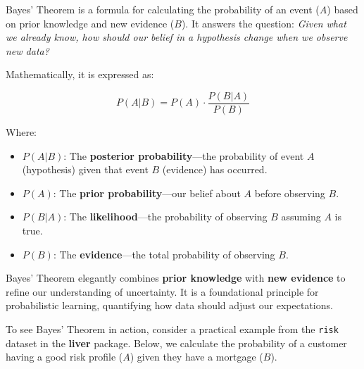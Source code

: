 \documentclass[
]{book}
\newcommand{\passthrough}[1]{#1}
\providecommand{\tightlist}{%
  \setlength{\itemsep}{0pt}\setlength{\parskip}{0pt}}
\theoremstyle{definition}
\theoremstyle{definition}
\theoremstyle{definition}
\theoremstyle{definition}
\theoremstyle{remark}
\begin{document}
Bayes' Theorem is a formula for calculating the probability of an event (\(A\)) based on prior knowledge and new evidence (\(B\)). It answers the question: \emph{Given what we already know, how should our belief in a hypothesis change when we observe new data?}

Mathematically, it is expressed as:

\begin{equation} 
P(A|B) = P(A) \cdot \frac{P(B|A)}{P(B)} 
\label{eq:bayes-theorem}
\end{equation}

Where:

\begin{itemize}
\tightlist
\item
  \textbf{\(P(A|B)\)}: The \textbf{posterior probability}---the probability of event \(A\) (hypothesis) given that event \(B\) (evidence) has occurred.
\item
  \textbf{\(P(A)\)}: The \textbf{prior probability}---our belief about \(A\) before observing \(B\).\\
\item
  \textbf{\(P(B|A)\)}: The \textbf{likelihood}---the probability of observing \(B\) assuming \(A\) is true.\\
\item
  \textbf{\(P(B)\)}: The \textbf{evidence}---the total probability of observing \(B\).
\end{itemize}

Bayes' Theorem elegantly combines \textbf{prior knowledge} with \textbf{new evidence} to refine our understanding of uncertainty. It is a foundational principle for probabilistic learning, quantifying how data should adjust our expectations.

To see Bayes' Theorem in action, consider a practical example from the \passthrough{\lstinline!risk!} dataset in the \textbf{liver} package. Below, we calculate the probability of a customer having a good risk profile (\(A\)) given they have a mortgage (\(B\)).
\end{document}
